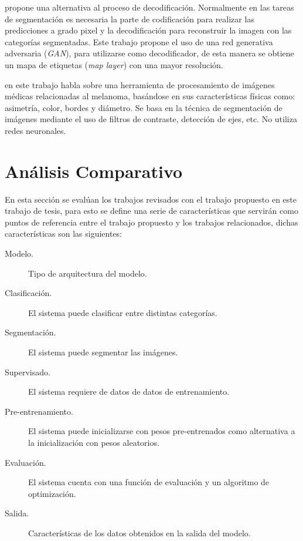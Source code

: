 \citet{DBLP:journals/corr/LucCCV16} propone una alternativa al proceso de decodificación. Normalmente en las tareas de segmentación es necesaria la parte de codificación para realizar las predicciones a grado pixel y la decodificación para reconstruir la imagen con las categorías segmentadas. Este trabajo propone el uso de una red generativa adversaria (\emph{GAN}), para utilizarse como decodificador, de esta manera se obtiene un mapa de etiquetas (\emph{map layer}) con una mayor resolución.

\citet{JAIN2015735} en este trabajo habla sobre una herramienta de procesamiento de imágenes médicas relacionadas al melanoma, basándose en sus características físicas como: asimetría, color, bordes y diámetro. Se basa en la técnica de segmentación de imágenes mediante el uso de filtros de contraste, detección de ejes, etc. No utiliza redes neuronales.


\section{Análisis Comparativo}
En esta sección se evalúan los trabajos revisados con el trabajo propuesto en este trabajo de tesis, para esto se define una serie de características que servirán como puntos de referencia entre el trabajo propuesto y los trabajos relacionados, dichas características son las siguientes:

\begin{description}
    \item[Modelo.]{Tipo de arquitectura del modelo.}
    \item[Clasificación.]{El sistema puede clasificar entre distintas categorías.}
    \item[Segmentación.]{El sistema puede segmentar las imágenes.}
    \item[Supervisado.]{ El sistema requiere de datos de datos de entrenamiento.}
    \item[Pre-entrenamiento.]{El sistema puede inicializarse con pesos pre-entrenados como alternativa a la inicialización con pesos aleatorios.}
    \item[Evaluación.]{El sistema cuenta con una función de evaluación y un algoritmo de optimización.}
    \item[Salida.]{Características de los datos obtenidos en la salida del modelo.}
\end{description}

